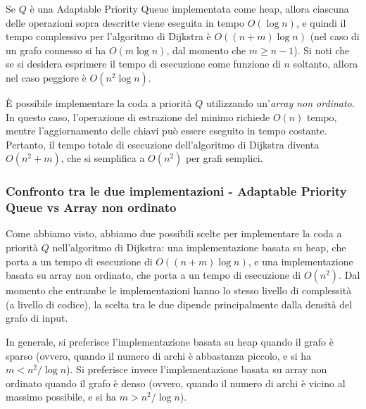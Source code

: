\noindent
Se $Q$ è una Adaptable Priority Queue implementata come heap, allora ciascuna delle operazioni sopra descritte viene eseguita in tempo $O(\log n)$, e quindi il tempo complessivo per l'algoritmo di Dijkstra è $O((n + m) \log n)$ (nel caso di un grafo connesso si ha $O(m \log n)$, dal momento che $m \geq n - 1$). Si noti che se si desidera esprimere il tempo di esecuzione come funzione di $n$ soltanto, allora nel caso peggiore è $O(n^2 \log n)$.

\vspace{1\baselineskip}
\noindent
È possibile implementare la coda a priorità $Q$ utilizzando un'\emph{array non ordinato}. In questo caso, l'operazione di estrazione del minimo richiede $O(n)$ tempo, mentre l'aggiornamento delle chiavi può essere eseguito in tempo costante. Pertanto, il tempo totale di esecuzione dell'algoritmo di Dijkstra diventa $O(n^2 + m)$, che si semplifica a $O(n^2)$ per grafi semplici.

\subsubsection{Confronto tra le due implementazioni - Adaptable Priority Queue vs Array non ordinato}
Come abbiamo visto, abbiamo due possibili scelte per implementare la coda a priorità $Q$ nell'algoritmo di Dijkstra: una implementazione basata su heap, che porta a un tempo di esecuzione di $O((n + m) \log n)$, e una implementazione basata su array non ordinato, che porta a un tempo di esecuzione di $O(n^2)$. Dal momento che entrambe le implementazioni hanno lo stesso livello di complessità (a livello di codice), la scelta tra le due dipende principalmente dalla densità del grafo di input.

In generale, si preferisce l'implementazione basata su heap quando il grafo è sparso (ovvero, quando il numero di archi è abbastanza piccolo, e si ha $m < n^2 / \log n$). Si preferisce invece l'implementazione basata su array non ordinato quando il grafo è denso (ovvero, quando il numero di archi è vicino al massimo possibile, e si ha $m > n^2 / \log n$).


